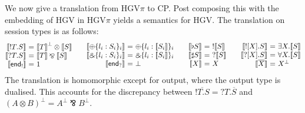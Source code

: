 \documentclass{easychair}
\makeatletter
\newcommand{\ba}{\begin{array}}
\newcommand{\ea}{\end{array}}
\newenvironment{eqs}{\ba{@{}r@{~}c@{~}l@{}}}{\ea}
\newcommand{\key}{\mathsf}
\newcommand{\set}[1]{\{ #1 \}}
\newcommand{\row}[2]{\set{#1}_{#2}}
\newcommand{\gvOutput}[2]{\mathord{!}{#1}.{#2}}
\newcommand{\gvInput}[2]{\mathord{?}{#1}.{#2}}
\newcommand{\gvEndOutput}{\key{end}_!}
\newcommand{\gvEndInput}{\key{end}_?}
\newcommand{\gvPlus}[2]{\oplus \row{#1}{#2}}
\newcommand{\gvChoice}[2]{\binampersand \row{#1}{#2}}
\newcommand{\gvServer}[1]{\flat {#1}}
\newcommand{\gvService}[1]{\sharp {#1}}
\newcommand{\gvDual}[1]{\overline{#1}}
\newcommand{\gvOutputType}[2]{![{#1}].{#2}}
\newcommand{\gvInputType}[2]{?[{#1}].{#2}}
\newcommand{\la}{l}
\newcommand{\cpTimes}[2]{{#1} \otimes {#2}}
\newcommand{\cpPar}[2]{{#1} \mathbin{\bindnasrepma} {#2}}
\newcommand{\cpPlus}[2]{\oplus \row{#1}{#2}}
\newcommand{\cpWith}[2]{\binampersand \row{#1}{#2}}
\newcommand{\cpOne}{1}
\newcommand{\cpBottom}{\bot}
\newcommand{\cpOfCourse}[1]{\mathord{!}{#1}}
\newcommand{\cpWhyNot}[1]{\mathord{?}{#1}}
\newcommand{\cpDual}[1]{{#1}^\bot}
\newcommand{\cpExists}[2]{\exists {#1}.{#2}}
\newcommand{\cpForall}[2]{\forall {#1}.{#2}}
\newcommand{\hgv}{HGV\xspace}
\newcommand{\hgvpi}{HGV$\pi$\xspace}
\newcommand{\hgvcp}[1]{\llbracket{#1}\rrbracket}
\makeatother
\begin{document}
We now give a translation from \hgvpi to CP. Post composing this with the embedding of \hgv in
\hgvpi yields a semantics for \hgv.
%
The translation on session types is as follows:
\[
\ba{@{}c@{\qquad}c@{\qquad}c@{\qquad}c@{}}
\begin{eqs}
\hgvcp{\gvOutput{T}{S}}         &=& \cpTimes{\cpDual{\hgvcp{T}}}{\hgvcp{S}} \\
\hgvcp{\gvInput{T}{S}}          &=& \cpPar{\hgvcp{T}}{\hgvcp{S}} \\
\hgvcp{\gvEndOutput}  &=& \cpOne \\
\end{eqs}
&
\begin{eqs}
\hgvcp{\gvPlus{\la_i:S_i}{i}}   &=& \cpPlus{\la_i:\hgvcp{S_i}}{i} \\
\hgvcp{\gvChoice{\la_i:S_i}{i}} &=& \cpWith{\la_i:\hgvcp{S_i}}{i} \\
\hgvcp{\gvEndInput}   &=& \cpBottom \\
\end{eqs}
&
\begin{eqs}
\hgvcp{\gvServer{S}}  &=& \cpOfCourse{\hgvcp{S}} \\
\hgvcp{\gvService{S}} &=& \cpWhyNot{\hgvcp{S}} \\
\hgvcp{X}                   &=& X \\
\end{eqs}
&
\begin{eqs}
\hgvcp{\gvOutputType{X}{S}} &=& \cpExists{X}{\hgvcp{S}} \\
\hgvcp{\gvInputType{X}{S}}  &=& \cpForall{X}{\hgvcp{S}} \\
\hgvcp{\gvDual{X}}          &=& \cpDual{X} \\
\end{eqs}
\ea
\]
The translation is homomorphic except for output, where the output type is dualised. This accounts
for the discrepancy between $\gvDual{\gvOutput{T}{S}} = \gvInput{T}{\gvDual{S}}$ and
$\cpDual{(\cpTimes{A}{B})} = \cpPar{\cpDual{A}}{\cpDual{B}}$.
%
\end{document}
